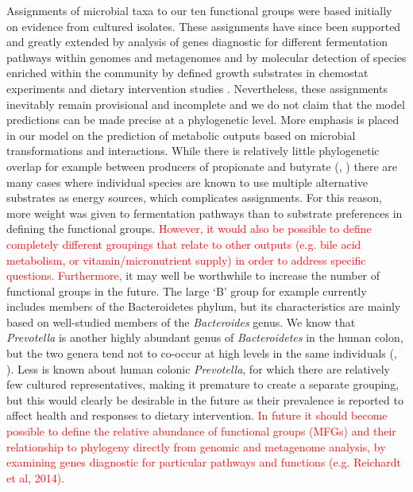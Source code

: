 \documentclass[a4paper]{article}
\begin{document}
Assignments of microbial taxa to our ten functional groups were based initially on evidence from cultured isolates. These assignments have since been supported and greatly extended by analysis of genes diagnostic for different fermentation pathways within genomes and metagenomes \citep{reichardt} and by molecular detection of species enriched within the community by defined growth substrates in chemostat experiments \citep{duncan16} and dietary intervention studies \citep{salonen}. Nevertheless, these assignments inevitably remain provisional and incomplete and we do not claim that the model predictions can be made precise at a phylogenetic level. More emphasis is placed in our model on the prediction of metabolic outputs based on microbial transformations and interactions. While there is relatively little phylogenetic overlap for example between producers of propionate and butyrate (\cite{reichardt}, \cite{louis17}) there are many cases where individual species are known to use multiple alternative substrates as energy sources, which complicates assignments. For this reason, more weight was given to fermentation pathways than to substrate preferences in defining the functional groups.  
\textcolor{red}{However, it would also be possible to define completely different groupings that relate to other outputs (e.g. bile acid metabolism, or vitamin/micronutrient supply) in order to address specific questions.
Furthermore,} it may well be worthwhile to increase the number of functional groups in the future. The large ‘B’ group for example currently includes members of the Bacteroidetes phylum, but its characteristics are mainly based on well-studied members of the \textit{Bacteroides} genus. We know that \textit{Prevotella} is another highly abundant genus of \textit{Bacteroidetes} in the human colon, but the two genera tend not to co-occur at high levels in the same individuals (\cite{wu}, \cite{chung}). Less is known about human colonic \textit{Prevotella}, for which there are relatively few cultured representatives, making it premature to create a separate grouping, but this would clearly be desirable in the future as their prevalence is reported to affect health and responses to dietary intervention.
\textcolor{red}{
In future it should become possible to define the relative abundance of functional groups (MFGs) and their relationship to phylogeny directly from genomic and metagenome analysis, by examining genes diagnostic for particular pathways and functions (e.g. Reichardt et al, 2014).}
\end{document}

